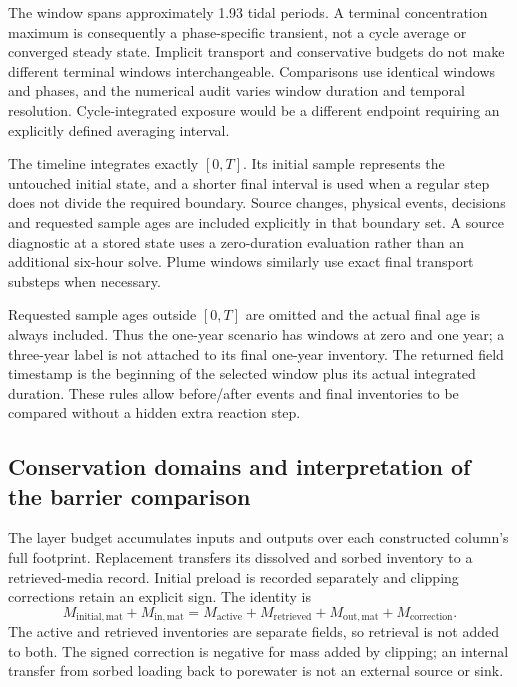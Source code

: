 The window spans approximately 1.93 tidal periods. A terminal concentration maximum is consequently a phase-specific transient, not a cycle average or converged steady state. Implicit transport and conservative budgets do not make different terminal windows interchangeable. Comparisons use identical windows and phases, and the numerical audit varies window duration and temporal resolution. Cycle-integrated exposure would be a different endpoint requiring an explicitly defined averaging interval.

The timeline integrates exactly $[0,T]$. Its initial sample represents the untouched initial state, and a shorter final interval is used when a regular step does not divide the required boundary. Source changes, physical events, decisions and requested sample ages are included explicitly in that boundary set. A source diagnostic at a stored state uses a zero-duration evaluation rather than an additional six-hour solve. Plume windows similarly use exact final transport substeps when necessary.

Requested sample ages outside $[0,T]$ are omitted and the actual final age is always included. Thus the one-year scenario has windows at zero and one year; a three-year label is not attached to its final one-year inventory. The returned field timestamp is the beginning of the selected window plus its actual integrated duration. These rules allow before/after events and final inventories to be compared without a hidden extra reaction step.

\subsection{Conservation domains and interpretation of the barrier comparison}
\label{sec:ledger_scope}

The layer budget accumulates inputs and outputs over each constructed column's full footprint. Replacement transfers its dissolved and sorbed inventory to a retrieved-media record. Initial preload is recorded separately and clipping corrections retain an explicit sign. The identity is
\begin{equation}
 M_{\mathrm{initial,mat}}+M_{\mathrm{in,mat}}
 =M_{\mathrm{active}}+M_{\mathrm{retrieved}}+M_{\mathrm{out,mat}}
 +M_{\mathrm{correction}}.
 \label{eq:mat_ledger}
\end{equation}
The active and retrieved inventories are separate fields, so retrieval is not added to both. The signed correction is negative for mass added by clipping; an internal transfer from sorbed loading back to porewater is not an external source or sink.

